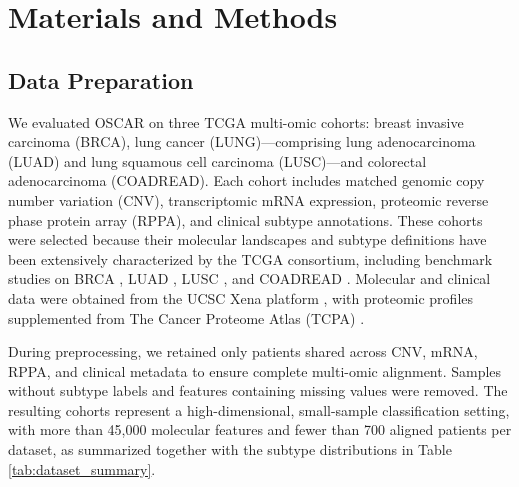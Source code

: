 \documentclass[lettersize,journal]{IEEEtran}
\begin{document}
% 



\section{Materials and Methods}

\subsection{Data Preparation}
We evaluated OSCAR on three TCGA multi-omic cohorts: breast invasive carcinoma (BRCA), lung cancer (LUNG)---comprising lung adenocarcinoma (LUAD) and lung squamous cell carcinoma (LUSC)---and colorectal adenocarcinoma (COADREAD). Each cohort includes matched genomic copy number variation (CNV), transcriptomic mRNA expression, proteomic reverse phase protein array (RPPA), and clinical subtype annotations. These cohorts were selected because their molecular landscapes and subtype definitions have been extensively characterized by the TCGA consortium, including benchmark studies on BRCA \cite{Koboldt2012BRCA}, LUAD \cite{TCGA2014LUAD}, LUSC \cite{TCGA2012LUSC}, and COADREAD \cite{TCGA2012COADREAD}. Molecular and clinical data were obtained from the UCSC Xena platform \cite{Goldman2020Xena}, with proteomic profiles supplemented from The Cancer Proteome Atlas (TCPA) \cite{Li2013TCPA}.

During preprocessing, we retained only patients shared across CNV, mRNA, RPPA, and clinical metadata to ensure complete multi-omic alignment. Samples without subtype labels and features containing missing values were removed. The resulting cohorts represent a high-dimensional, small-sample classification setting, with more than 45,000 molecular features and fewer than 700 aligned patients per dataset, as summarized together with the subtype distributions in Table \ref{tab:dataset_summary}. 
\end{document}

